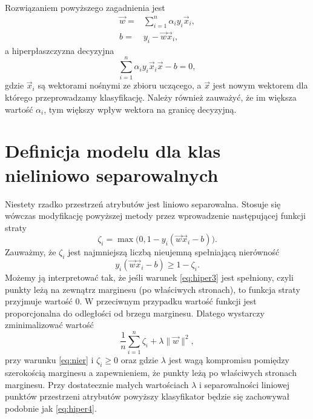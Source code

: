 \documentclass[
]{book}
\theoremstyle{plain}
\theoremstyle{definition}
\theoremstyle{definition}
\theoremstyle{definition}
\theoremstyle{definition}
\theoremstyle{remark}
\begin{document}
Rozwiązaniem powyższego zagadnienia jest
\begin{align}
    \vec{w}=&\sum_{i=1}^{n}\alpha_iy_i\vec{x}_i,\label{eq:lagrange3}\\
        b=&y_i-\vec{w}\vec{x}_i,
        \label{eq:lagrange4}
\end{align}
a hiperpłaszczyzna decyzyjna
\begin{equation}
\sum_{i=1}^{n}\alpha_iy_i\vec{x}_i\vec{x}-b=0,
\label{eq:hiper5}
\end{equation}
gdzie \(\vec{x}_i\) są wektorami nośnymi ze zbioru uczącego, a \(\vec{x}\) jest nowym wektorem dla którego przeprowadzamy klasyfikację.
Należy również zauważyć, że im większa wartość \(\alpha_i\), tym większy wpływ wektora na granicę decyzyjną.

\hypertarget{definicja-modelu-dla-klas-nieliniowo-separowalnych}{%
\section{Definicja modelu dla klas nieliniowo separowalnych}\label{definicja-modelu-dla-klas-nieliniowo-separowalnych}}

Niestety rzadko przestrzeń atrybutów jest liniowo separowalna. Stosuje się wówczas modyfikację powyższej metody przez wprowadzenie następującej funkcji straty
\begin{equation}
    \zeta_i=\max\big(0,1-y_i(\vec{w}\vec{x}_i-b)\big).
    \label{eq:strata1}
\end{equation}
Zauważmy, że \(\zeta_i\) jest najmniejszą liczbą nieujemną spełniającą nierówność
\begin{equation}
    y_i(\vec{w}\vec{x}_i-b)\geq 1-\zeta_i.
    \label{eq:nier}
\end{equation}
Możemy ją interpretować tak, że jeśli warunek \eqref{eq:hiper3} jest spełniony, czyli punkty leżą na zewnątrz marginesu (po właściwych stronach), to funkcja straty przyjmuje wartość 0. W przeciwnym przypadku wartość funkcji jest proporcjonalna do odległości od brzegu marginesu. Dlatego wystarczy zminimalizować wartość
\begin{equation}
    \frac{1}{n}\sum_{i=1}^{n}\zeta_i+\lambda\|\vec{w}\|^2,
    \label{eq:strata2}
\end{equation}
przy warunku \eqref{eq:nier} i \(\zeta_i\geq 0\) oraz gdzie \(\lambda\) jest wagą kompromisu pomiędzy szerokością marginesu a zapewnieniem, że punkty leżą po właściwych stronach marginesu. Przy dostatecznie małych wartościach \(\lambda\) i separowalności liniowej punktów przestrzeni atrybutów powyższy klasyfikator będzie się zachowywał podobnie jak \eqref{eq:hiper4}.
\end{document}
